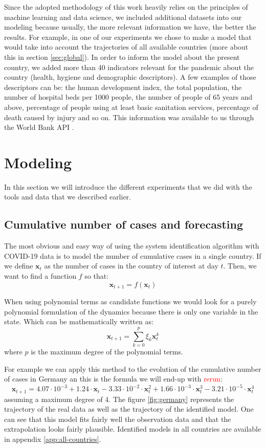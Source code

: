 \documentclass[12pt, letterpaper]{article}
\newcommand{\com}[1]{{\small {\fontfamily{ptm} \selectfont \textcolor{red}{#1}}}}
\begin{document}
Since the adopted methodology of this work heavily relies on the principles of machine learning and data science, we included additional datasets into our modeling because usually, the more relevant information we have, the better the results. 
For example, in one of our experiments we chose to make a model that would take into account the trajectories of all available countries (more about this in section \ref{sec:global}). 
In order to inform the model about the present country, we added more than 40 indicators relevant for the pandemic about the country (health, hygiene and demographic descriptors). 
A few examples of those descriptors can be: the human development index, the total population, the number of hospital beds per 1000 people, the number of people of 65 years and above, percentage of people using at least basic sanitation services, percentage of death caused by injury and so on.
This information was available to us through the World Bank API \cite{}.

\section{Modeling}\label{sec:modeling}

In this section we will introduce the different experiments that we did with the tools and data that we described earlier.

\subsection{Cumulative number of cases and forecasting}

The most obvious and easy way of using the system identification algorithm with COVID-19 data is to model the number of cumulative cases in a single country. If we define $\mathbf{x}_t$ as the number of cases in the country of interest at day $t$. Then, we want to find a function $f$ so that:
$$\mathbf{x}_{t+1} = f(\mathbf{x}_t)$$

When using polynomial terms as candidate functions we would look for a purely polynomial formulation of the dynamics because there is only one variable in the state. 
Which can be mathematically written as:
$$\mathbf{x}_{t+1} = \sum_{k=0}^p \xi_k \mathbf{x}_t^k$$
where $p$ is the maximum degree of the polynomial terms.

For example we can apply this method to the evolution of the cumulative number of cases in Germany an this is the formula we will end-up with \com{rerun}:
$$\mathbf{x}_{t+1} = 4.07 \cdot 10^{-3} + 1.24 \cdot \mathbf{x}_t - 3.33 \cdot 10^{-2} \cdot \mathbf{x}_t^2 + 1.66 \cdot 10^{-3} \cdot \mathbf{x}_t^3 - 3.21 \cdot 10^{-5} \cdot \mathbf{x}_t^4$$
assuming a maximum degree of 4. 
The figure \ref{fig:germany} represents the trajectory of the real data as well as the trajectory of the identified model. 
One can see that this model fits fairly well the observation data and that the extrapolation looks fairly plausible. 
Identified models in all countries are available in appendix \ref{app:all-countries}.
\end{document}
